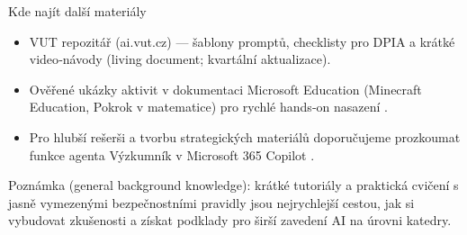 Kde najít další materiály
\begin{itemize}
  \item VUT repozitář (ai.vut.cz) — šablony promptů, checklisty pro DPIA a krátké video‑návody (living document; kvartální aktualizace).
  \item Ověřené ukázky aktivit v dokumentaci Microsoft Education (Minecraft Education, Pokrok v matematice) pro rychlé hands‑on nasazení \cite{kb_ai_101_tipu_pdf_04e4a115_page_15_2,kb_ai_101_tipu_pdf_04e4a115_page_8_1}.
  \item Pro hlubší rešerši a tvorbu strategických materiálů doporučujeme prozkoumat funkce agenta Výzkumník v Microsoft 365 Copilot \cite{kb_ai_101_tipu_pdf_04e4a115_page_48_1}.
\end{itemize}

Poznámka (general background knowledge): krátké tutoriály a praktická cvičení s jasně vymezenými bezpečnostními pravidly jsou nejrychlejší cestou, jak si vybudovat zkušenosti a získat podklady pro širší zavedení AI na úrovni katedry.